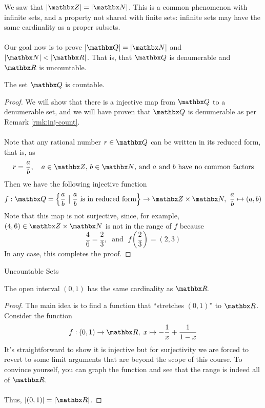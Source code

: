 
\begin{discussion}
We saw that $\abs{\zz} = \abs{\nn}$. This is a common phenomenon with infinite sets, and a property not shared with finite sets: infinite sets may have the same cardinality as a proper subsets.\\
\\
Our goal now is to prove $\abs{\qq} = \abs{\nn}$ and $\abs{\nn} < \abs{\rr}$. That is, that $\qq$ is denumerable and $\rr$ is uncountable.
\end{discussion}

\vspace*{1em}

\begin{theorem}
The set $\qq$ is countable. 
\end{theorem}
\begin{proof}
We will show that there is a injective map from $\qq$ to a denumerable set, and we will have proven that $\qq$ is denumerable as per Remark \ref{rmk:inj-count}.\\
\\
Note that any rational number $r \in \qq$ can be written in its reduced form, that is, as
\[r = \frac{a}{b},\quad \text{$a \in \zz$, $b \in \nn$, and $a$ and $b$ have no common factors}\]
Then we have the following injective function
\[f:\qq = \left\{\frac{a}{b}\ \big\vert\; \frac{a}{b}\text{ is in reduced form}\right\} \to \zz \times \nn,\ \frac{a}{b} \mapsto (a,b)\]
Note that this map is not surjective, since, for example, $(4,6) \in \zz \times \nn$ is not in the range of $f$ because
\[\frac{4}{6} = \frac{2}{3},\;\text{ and }\; f\left(\frac{2}{3}\right) = (2,3)\]
In any case, this completes the proof.
\end{proof}

\vspace*{2em}

\begin{mdframed}
\begin{center}
{\Large Uncountable Sets}
\end{center}
\end{mdframed}

\begin{theorem}
The open interval $(0,1)$ has the same cardinality as $\rr$.
\end{theorem}
\begin{proof}
The main idea is to find a function that 	``stretches $(0,1)$'' to $\rr$. Consider the function
\[f:(0,1) \to \rr,\; x \mapsto -\frac{1}{x} + \frac{1}{1 - x}\]
It's straightforward to show it is injective but for surjectivity we are forced to revert to some limit arguments that are beyond the scope of this course. To convince yourself, you can graph the function and see that the range is indeed all of $\rr$.\\
\\
Thus, $\abs{(0,1)} = \abs{\rr}$.
\end{proof}

